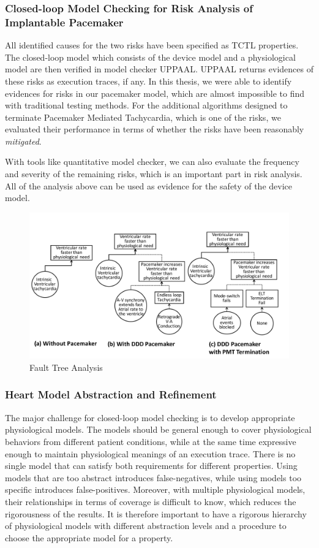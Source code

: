 \documentclass[a4paper]{article}
\begin{document}
\subsubsection{Closed-loop Model Checking for Risk Analysis of Implantable Pacemaker}
All identified causes for the two risks have been specified as TCTL properties.
The closed-loop model which consists of the device model and a physiological model are then verified in model checker UPPAAL.
UPPAAL returns evidences of these risks as execution traces, if any.
In this thesis, we were able to identify evidences for risks in our pacemaker model, which are almost impossible to find with traditional testing methods.
For the additional algorithms designed to terminate Pacemaker Mediated Tachycardia, which is one of the risks, we evaluated their performance in terms of whether the risks have been reasonably \emph{mitigated}.

With tools like quantitative model checker, we can also evaluate the frequency and severity of the remaining risks, which is an important part in risk analysis.
All of the analysis above can be used as evidence for the safety of the device model.
\begin{figure}[t]
	\centering
	\includegraphics[scale=0.35]{figs/FTA_new.pdf}
	\caption{\small Fault Tree Analysis}
	\label{fig:FTA}
\end{figure}
\subsubsection{Heart Model Abstraction and Refinement}

The major challenge for closed-loop model checking is to develop appropriate physiological models. 
The models should be general enough to cover physiological behaviors from different patient conditions, while at the same time expressive enough to maintain physiological meanings of an execution trace.
There is no single model that can satisfy both requirements for different properties.
Using models that are too abstract introduces false-negatives, while using models too specific introduces false-positives.
Moreover, with multiple physiological models, their relationships in terms of coverage is difficult to know, which reduces the rigorousness of the results.
It is therefore important to have a rigorous hierarchy of physiological models with different abstraction levels and a procedure to choose the appropriate model for a property.
\end{document}
